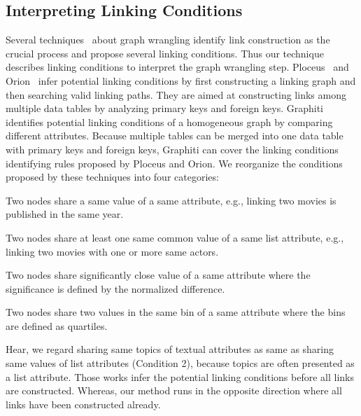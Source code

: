 \subsection{Interpreting Linking Conditions}
Several techniques~\cite{DBLP:journals/ivs/LiuNS14, DBLP:journals/ivs/HeerP14, DBLP:journals/tvcg/SrinivasanPEB18} about graph wrangling identify link construction as the crucial process and propose several linking conditions.
Thus our technique describes linking conditions to interpret the graph wrangling step.
Ploceus~\cite{DBLP:journals/ivs/LiuNS14} and Orion~\cite{DBLP:journals/ivs/HeerP14} infer potential linking conditions by first constructing a linking graph and then searching valid linking paths. They are aimed at constructing links among multiple data tables by analyzing primary keys and foreign keys.
Graphiti~\cite{DBLP:journals/tvcg/SrinivasanPEB18} identifies potential linking conditions of a homogeneous graph by comparing different attributes.
Because multiple tables can be merged into one data table with primary keys and foreign keys, Graphiti can cover the linking conditions identifying rules proposed by Ploceus and Orion. %
We reorganize the conditions proposed by these techniques into four categories:
\begin{compactenum}[\textbf{C}1]
    \item Two nodes share a same value of a same attribute, e.g., linking two movies is published in the same year.
    \item Two nodes share at least one same common value of a same list attribute, e.g., linking two movies with one or more same actors.
    \item Two nodes share significantly close value of a same attribute where the significance is defined by the normalized difference.
    \item Two nodes share two values in the same bin of a same attribute where the bins are defined as quartiles.
\end{compactenum}
Hear, we regard sharing same topics of textual attributes as same as sharing same values of list attributes (Condition 2), because topics are often presented as a list attribute. %
Those works infer the potential linking conditions before all links are constructed. 
Whereas, our method runs in the opposite direction where all links have been constructed already.

